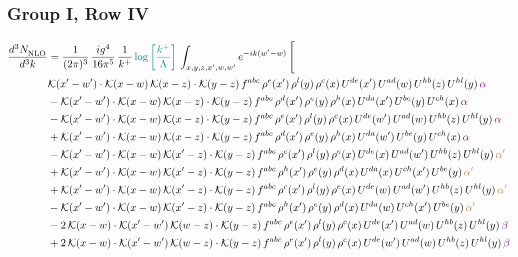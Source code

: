 \documentclass[9pt]{article}
\numberwithin{equation}{section}
\begin{document}
\subsubsection{Group I, Row IV}
\begin{align}
    \frac{d^{3}N_{\rm NLO}^{\rm}}{d^{3}k}  & = \frac{1}{(2\pi)^{3}}\, \frac{ig^{4}}{16\pi^{5}}\, \frac{1}{k^{+}}\, {\color{teal}\log{\left[\frac{k^{+}}{\Lambda}\right]}}\, \int_{x,y,z,x^{\prime},w,w^{\prime}}e^{-ik(w^{\prime}-w)}\, \Bigg[\notag \\ & \mathcal{K}(x'-w')\cdot \mathcal{K}(x-w)\,\mathcal{K}(x-z)\cdot \mathcal{K}(y-z)\,f^{abc}\, \rho^{e}(x')\, \rho^{l}(y)\,\rho^{c}(x)\, U^{de}(x')\,U^{ad}(w)\,U^{hb}(z)\,U^{hl}(y)\, {\color{violet}\alpha}\notag \\ & -\mathcal{K}(x'-w')\cdot \mathcal{K}(x-w)\,\mathcal{K}(x-z)\cdot \mathcal{K}(y-z)\,f^{abc}\, \rho^{d}(x')\, \rho^{e}(y)\,\rho^{h}(x)\, U^{da}(x')\,U^{be}(y)\,U^{ch}(x)\,{\color{violet} \alpha}\notag \\ & -\mathcal{K}(x'-w')\cdot \mathcal{K}(x-w)\,\mathcal{K}(x-z)\cdot \mathcal{K}(y-z)\,f^{abc}\, \rho^{e}(x')\, \rho^{l}(y)\,\rho^{c}(x)\, U^{de}(w')\,U^{ad}(w)\,U^{hb}(z)\,U^{hl}(y)\,{\color{violet} \alpha}\notag\\ & +\mathcal{K}(x'-w')\cdot \mathcal{K}(x-w)\,\mathcal{K}(x-z)\cdot \mathcal{K}(y-z)\,f^{abc}\, \rho^{d}(x')\, \rho^{e}(y)\,\rho^{h}(x)\, U^{da}(w')\,U^{be}(y)\,U^{ch}(x)\,{\color{violet} \alpha}\notag\\ &-\mathcal{K}(x'-w')\cdot\mathcal{K}(x-w)\,\mathcal{K}(x'-z)\cdot\mathcal{K}(y-z)\, f^{abc}\,\rho^{c}(x')\,\rho^{l}(y)\,\rho^{e}(x)\,U^{de}(x)\,U^{ad}(w')\,U^{hb}(z)\,U^{hl}(y)\,{\color{brown} \alpha'}\notag\\ & +\mathcal{K}(x'-w')\cdot\mathcal{K}(x-w)\,\mathcal{K}(x'-z)\cdot\mathcal{K}(y-z)\, f^{abc}\,\rho^{h}(x')\,\rho^{e}(y)\,\rho^{d}(x)\,U^{da}(x)\,U^{ch}(x')\,U^{be}(y)\,{\color{brown} \alpha'}\notag\\
&+\mathcal{K}(x'-w')\cdot\mathcal{K}(x-w)\,\mathcal{K}(x'-z)\cdot\mathcal{K}(y-z)\, f^{abc}\,\rho^{c}(x')\,\rho^{l}(y)\,\rho^{e}(x)\,U^{de}(w)\,U^{ad}(w')\,U^{hb}(z)\,U^{hl}(y)\,{\color{brown} \alpha'}\notag \\ &-\mathcal{K}(x'-w')\cdot\mathcal{K}(x-w)\,\mathcal{K}(x'-z)\cdot\mathcal{K}(y-z)\, f^{abc}\,\rho^{h}(x')\,\rho^{e}(y)\,\rho^{d}(x)\,U^{da}(w)\,U^{ch}(x')\,U^{be}(y)\,{\color{brown} \alpha'}\notag \\ &  -2\,\mathcal{K}(x-w)\cdot \mathcal{K}(x'-w')\, \mathcal{K}(w-z)\cdot \mathcal{K}(y-z)\, f^{abc}\,\rho^{e}(x')\,\rho^{l}(y)\,\rho^{c}(x)\, U^{de}(x')\,U^{ad}(w)\,U^{hb}(z)\,U^{hl}(y)\,{\color{violet} \beta}\notag\\ & +2\,\mathcal{K}(x-w)\cdot \mathcal{K}(x'-w')\, \mathcal{K}(w-z)\cdot \mathcal{K}(y-z)\, f^{abc}\,\rho^{e}(x')\,\rho^{l}(y)\,\rho^{c}(x)\, U^{de}(w')\,U^{ad}(w)\,U^{hb}(z)\,U^{hl}(y)\,{\color{violet} \beta}\notag\\

\end{align}
\end{document}
